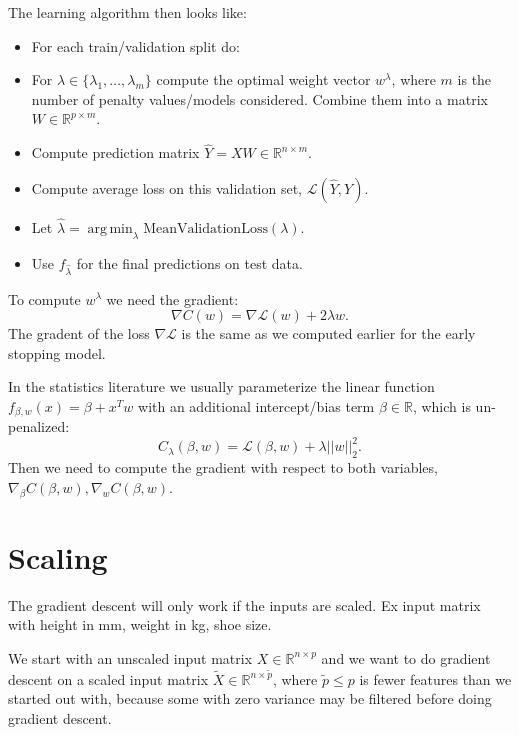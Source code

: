 \documentclass{article}
\DeclareMathOperator*{\argmin}{arg\,min}
\begin{document}
The learning algorithm then looks like:
\begin{itemize}
\item For each train/validation split do:
\item For $\lambda\in\{\lambda_1, \dots, \lambda_{m}\}$ compute the
  optimal weight vector $w^\lambda$, where $m$ is the number of
  penalty values/models considered. Combine them into a matrix
  $W\in\mathbb R^{p\times m}$.
\item Compute prediction matrix $\hat Y = XW\in\mathbb R^{n\times m}$.
\item Compute average loss on this validation set,
  $\mathcal L(\hat Y, Y)$.
\item Let $\hat \lambda = \argmin_\lambda \text{MeanValidationLoss}(\lambda)$.
\item Use $f_{\hat \lambda}$ for the final predictions on test data.
\end{itemize}

To compute $w^\lambda$ we need the gradient:
\begin{equation}
  \label{eq:L2-reg-gradient}
  \nabla C(w) = \nabla \mathcal L(w) + 2\lambda w.
\end{equation}
The gradent of the loss $\nabla \mathcal L$ is the same as we computed
earlier for the early stopping model.

In the statistics literature we usually parameterize the linear
function $f_{\beta,w}(x)=\beta + x^T w$ with an additional
intercept/bias term $\beta\in\mathbb R$, which is un-penalized:
\begin{equation}
  \label{eq:cost-bias}
  C_\lambda(\beta, w) = \mathcal L(\beta,w) + \lambda||w||_2^2.
\end{equation}
Then we need to compute the gradient with respect to both variables,
$\nabla_\beta C(\beta, w), \nabla_w C(\beta, w)$.

\section{Scaling}

The gradient descent will only work if the inputs are scaled. Ex input
matrix with height in mm, weight in kg, shoe size.

We start with an unscaled input matrix $X\in\mathbb R^{n \times p}$
and we want to do gradient descent on a scaled input matrix
$\tilde X\in\mathbb R^{n\times \tilde p}$, where $\tilde p\leq p$ is
fewer features than we started out with, because some with zero
variance may be filtered before doing gradient descent.
\end{document}
